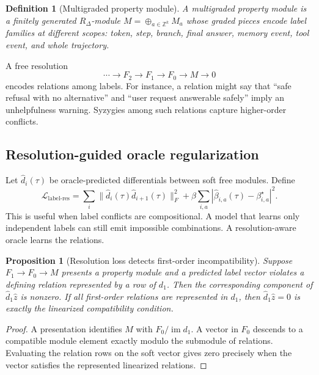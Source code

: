 \documentclass[11pt]{article}
\newtheorem{proposition}[theorem]{Proposition}
\newtheorem{definition}[theorem]{Definition}
\newcommand{\ZZ}{\mathbb{Z}}
\newcommand{\im}{\operatorname{im}}
\newcommand{\loss}{\mathcal{L}}
\numberwithin{equation}{section}
\begin{document}
\begin{definition}[Multigraded property module]
A multigraded property module is a finitely generated $R_\Delta$-module $M=\oplus_{a\in\ZZ^k}M_a$ whose graded pieces encode label families at different scopes: token, step, branch, final answer, memory event, tool event, and whole trajectory.
\end{definition}

A free resolution
\begin{equation}
\cdots\to F_2\to F_1\to F_0\to M\to 0
\end{equation}
encodes relations among labels. For instance, a relation might say that ``safe refusal with no alternative'' and ``user request answerable safely'' imply an unhelpfulness warning. Syzygies among such relations capture higher-order conflicts.

\subsection{Resolution-guided oracle regularization}
Let $\widehat d_i(\tau)$ be oracle-predicted differentials between soft free modules. Define
\begin{equation}
\loss_{\mathrm{label\mbox{-}res}}=\sum_i\|\widehat d_i(\tau)\widehat d_{i+1}(\tau)\|_F^2+\beta\sum_{i,a}|\widehat\beta_{i,a}(\tau)-\beta_{i,a}^{\star}|^2.
\end{equation}
This is useful when label conflicts are compositional. A model that learns only independent labels can still emit impossible combinations. A resolution-aware oracle learns the relations.

\begin{proposition}[Resolution loss detects first-order incompatibility]
Suppose $F_1\to F_0\to M$ presents a property module and a predicted label vector violates a defining relation represented by a row of $d_1$. Then the corresponding component of $\widehat d_1\hat z$ is nonzero. If all first-order relations are represented in $d_1$, then $\widehat d_1\hat z=0$ is exactly the linearized compatibility condition.
\end{proposition}
\begin{proof}
A presentation identifies $M$ with $F_0/\im d_1$. A vector in $F_0$ descends to a compatible module element exactly modulo the submodule of relations. Evaluating the relation rows on the soft vector gives zero precisely when the vector satisfies the represented linearized relations.
\end{proof}
\end{document}
